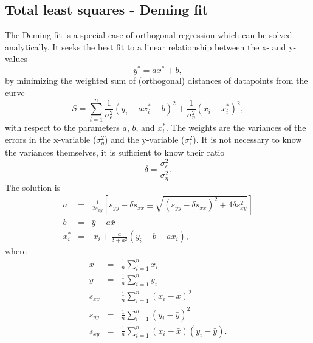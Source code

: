 \subsection{Total least squares - Deming fit} \label{tls}
The Deming fit is a special case of orthogonal regression which can be solved analytically. 
It seeks the best fit to a linear relationship between the x- and y-values
\begin{equation}
 y^* = ax^* +b,
\end{equation}
by minimizing the weighted sum of (orthogonal) distances of datapoints from the curve 
\begin{equation*}
 S = \sum_{i=1}^n \frac1{\sigma_\epsilon^2} (y_i - a x_i^* -b	)^2 + \frac1{\sigma_\eta^2}(x_i - x_i^*)^2,
\end{equation*} 
with respect to the parameters $a$, $b$, and $x_i^*$.
The weights are the variances of the errors in the x-variable ($\sigma_\eta^2$) and the y-variable ($\sigma_\epsilon^2$). It is not necessary to know the variances themselves, it is sufficient to know their ratio
\begin{equation}
 \delta = \frac{\sigma_{\epsilon}^2}{\sigma_\eta^2}.
\end{equation}
The solution is
\begin{eqnarray}
 a &=& \frac1{2 s_{xy}} \left[ s_{yy}-\delta s_{xx} \pm \sqrt{ ( s_{yy} - \delta s_{xx})^2 + 4 \delta s_{xy}^2} \right] \\
 b &=& \bar y -a \bar x \\
 x_i^* &=& \ x_i + \frac{a}{\delta +a^2} \left( y_i -b - a x_i \right),
 \end{eqnarray}
where
\begin{eqnarray}
 \bar x &=& \frac1n \sum_{i=1}^n x_i \\
 \bar y &=& \frac1n \sum_{i=1}^n y_i \\
 s_{xx} &=& \frac1n \sum_{i=1}^n (x_i - \bar x)^2 \\
 s_{yy} &=& \frac1n \sum_{i=1}^n (y_i - \bar y)^2 \\
 s_{xy} &=& \frac1n \sum_{i=1}^n (x_i - \bar x)(y_i - \bar y).
 \end{eqnarray}

